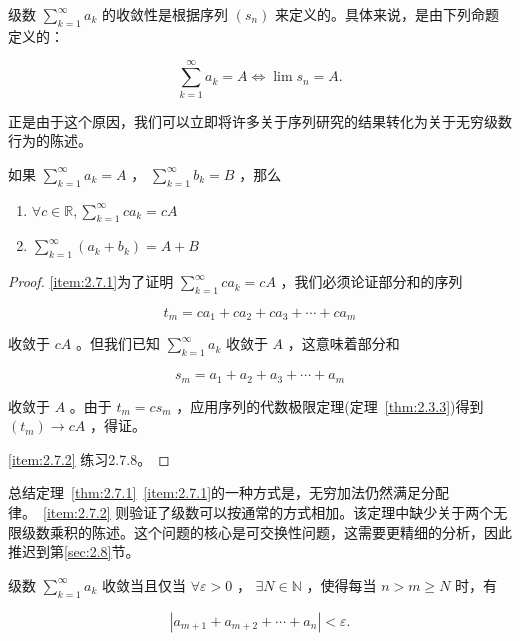 级数 \(\mathop{\sum }\limits_{{k = 1}}^{\infty }{a}_{k}\) 的收敛性是根据序列 \(\left( {s}_{n}\right)\) 来定义的。具体来说，是由下列命题定义的：

\[
\mathop{\sum }\limits_{{k = 1}}^{\infty }{a}_{k} = A\Leftrightarrow \lim {s}_{n} = A.
\]

正是由于这个原因，我们可以立即将许多关于序列研究的结果转化为关于无穷级数行为的陈述。

\begin{Thm}[级数的代数极限定理]
  \label{thm:2.7.1}
  如果 \(\mathop{\sum }\limits_{{k = 1}}^{\infty }{a}_{k} = A\) ， \(\mathop{\sum }\limits_{{k = 1}}^{\infty }{b}_{k} = B\) ，那么
\begin{enumerate}[label = (\roman*)]
\item\label{item:2.7.1} \(\forall c\in \mathbb{R}, \mathop{\sum }\limits_{{k = 1}}^{\infty }c{a}_{k} = {cA}\) 
\item \label{item:2.7.2}\(\mathop{\sum }\limits_{{k = 1}}^{\infty }\left( {{a}_{k} + {b}_{k}}\right)  = A + B\) 
\end{enumerate}
\end{Thm}


\begin{proof}
  \ref{item:2.7.1}为了证明 \(\mathop{\sum }\limits_{{k = 1}}^{\infty }c{a}_{k} = {cA}\) ，我们必须论证部分和的序列

\[
{t}_{m} = c{a}_{1} + c{a}_{2} + c{a}_{3} + \cdots  + c{a}_{m}
\]

收敛于 \({cA}\) 。但我们已知 \(\mathop{\sum }\limits_{{k = 1}}^{\infty }{a}_{k}\) 收敛于 \(A\) ，这意味着部分和

\[
{s}_{m} = {a}_{1} + {a}_{2} + {a}_{3} + \cdots  + {a}_{m}
\]

收敛于 \(A\) 。由于 \({t}_{m} = c{s}_{m}\) ，应用序列的代数极限定理(定理~\ref{thm:2.3.3})得到 \(\left( {t}_{m}\right)  \rightarrow  {cA}\) ，得证。

\ref{item:2.7.2} 练习2.7.8。
\end{proof}


总结定理~\ref{thm:2.7.1}~\ref{item:2.7.1}的一种方式是，无穷加法仍然满足分配律。~\ref{item:2.7.2} 则验证了级数可以按通常的方式相加。该定理中缺少关于两个无限级数乘积的陈述。这个问题的核心是可交换性问题，这需要更精细的分析，因此推迟到第\ref{sec:2.8}节。

\begin{Thm}[级数的Cauchy准则]
  \label{thm:2.7.2}
级数 \(\mathop{\sum }\limits_{{k = 1}}^{\infty }{a}_{k}\) 收敛当且仅当 \(\forall \varepsilon  > 0\) ， \(\exists N \in  \mathbb{N}\) ，使得每当 \(n > m \geq  N\) 时，有

\[
\left| {{a}_{m + 1} + {a}_{m + 2} + \cdots  + {a}_{n}}\right|  < \varepsilon .
\]
  
\end{Thm}

